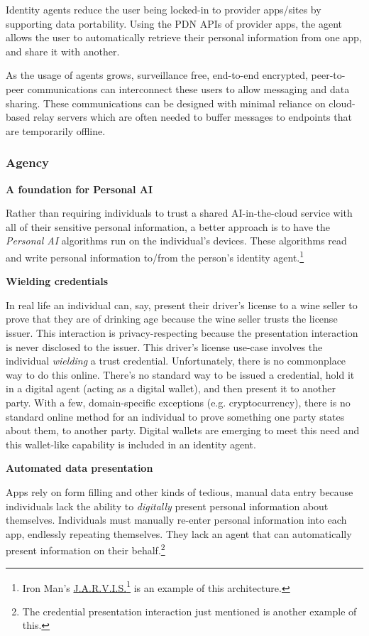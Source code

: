 \documentclass[11pt, oneside]{article}   	%
\newcommand{\hyperfootnote}[1][]{\def\ArgI{{#1}}\hyperfootnoteRelay}
\newcommand\hyperfootnoteRelay[2][]{\href{#1#2}{\ArgI}\footnote{\href{#1#2}{#2}}}
\begin{document}
Identity agents reduce the user being locked-in to provider apps/sites by supporting data portability. Using the PDN APIs of provider apps, the agent allows the user to automatically retrieve their personal information from one app, and share it with another. 

As the usage of agents grows, surveillance free, end-to-end encrypted, peer-to-peer communications can interconnect these users to allow messaging and data sharing. These communications can be designed with minimal reliance on cloud-based relay servers which are often needed to buffer messages to endpoints that are temporarily offline.

\subsubsection{Agency}

\textbf{A foundation for Personal AI}

Rather than requiring individuals to trust a shared AI-in-the-cloud service with all of their sensitive personal information, a better approach is to have the \emph{Personal AI} algorithms run on the individual's devices. These algorithms read and write personal information to/from the person's identity agent.\footnote{Iron Man's \hyperfootnote[J.A.R.V.I.S.][https://]{en.wikipedia.org/wiki/J.A.R.V.I.S.} is an example of this architecture.}

\textbf{Wielding credentials}

In real life an individual can, say, present their driver's license to a wine seller to prove that they are of drinking age because the wine seller trusts the license issuer. This interaction is privacy-respecting because the presentation interaction is never disclosed to the issuer. This driver's license use-case involves the individual \emph{wielding} a trust credential. Unfortunately, there is no commonplace way to do this online. There's no standard way to be issued a credential, hold it in a digital agent (acting as a digital wallet), and then present it to another party. With a few, domain-specific exceptions (e.g. cryptocurrency), there is no standard online method for an individual to prove something one party states about them, to another party. Digital wallets are emerging to meet this need and this wallet-like capability is included in an identity agent.

\textbf{Automated data presentation}

Apps rely on form filling and other kinds of tedious, manual data entry because individuals lack the ability to \emph{digitally} present personal information about themselves. Individuals must manually re-enter personal information into each app, endlessly repeating themselves. They lack an agent that can automatically present information on their behalf.\footnote{The credential presentation interaction just mentioned is another example of this.} 
\end{document}
